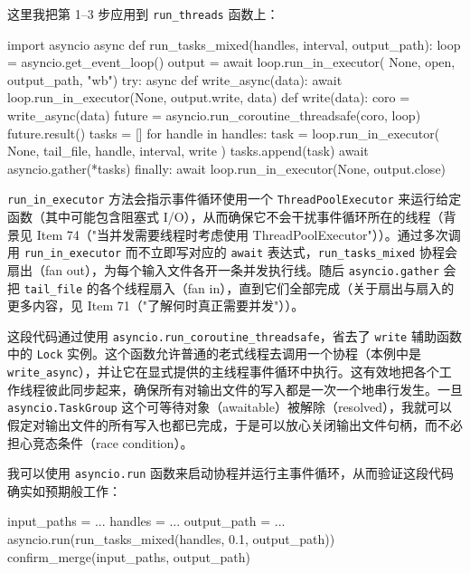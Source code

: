 这里我把第 1–3 步应用到 \texttt{run\_threads} 函数上：

\begin{codebox}[python]
import asyncio
async def run_tasks_mixed(handles, interval, output_path):
    loop = asyncio.get_event_loop()
     output = await loop.run_in_executor(
    None, open, output_path, "wb")
    try:
        async def write_async(data):
            await loop.run_in_executor(None, output.write, data)
        def write(data):
            coro = write_async(data)
            future = asyncio.run_coroutine_threadsafe(coro, loop)
            future.result()
        tasks = []
        for handle in handles:
            task = loop.run_in_executor(
                None, tail_file, handle, interval, write
            )
            tasks.append(task)
        await asyncio.gather(*tasks)
    finally:
        await loop.run_in_executor(None, output.close)
\end{codebox}

\texttt{run\_in\_executor} 方法会指示事件循环使用一个 \texttt{ThreadPoolExecutor} 来运行给定函数（其中可能包含阻塞式 I/O），从而确保它不会干扰事件循环所在的线程（背景见 Item 74（"当并发需要线程时考虑使用 ThreadPoolExecutor"））。通过多次调用 \texttt{run\_in\_executor} 而不立即写对应的 \texttt{await} 表达式，\texttt{run\_tasks\_mixed} 协程会扇出（fan out），为每个输入文件各开一条并发执行线。随后 \texttt{asyncio.gather} 会把 \texttt{tail\_file} 的各个线程扇入（fan in），直到它们全部完成（关于扇出与扇入的更多内容，见 Item 71（"了解何时真正需要并发"））。

这段代码通过使用 \texttt{asyncio.run\_coroutine\_threadsafe}，省去了 \texttt{write} 辅助函数中的 \texttt{Lock} 实例。这个函数允许普通的老式线程去调用一个协程（本例中是 \texttt{write\_async}），并让它在显式提供的主线程事件循环中执行。这有效地把各个工作线程彼此同步起来，确保所有对输出文件的写入都是一次一个地串行发生。一旦 \texttt{asyncio.TaskGroup} 这个可等待对象（awaitable）被解除（resolved），我就可以假定对输出文件的所有写入也都已完成，于是可以放心关闭输出文件句柄，而不必担心竞态条件（race condition）。

我可以使用 \texttt{asyncio.run} 函数来启动协程并运行主事件循环，从而验证这段代码确实如预期般工作：

\begin{codebox}[python]
input_paths = ...
handles = ...
output_path = ...
asyncio.run(run_tasks_mixed(handles, 0.1, output_path))
confirm_merge(input_paths, output_path)
\end{codebox}

